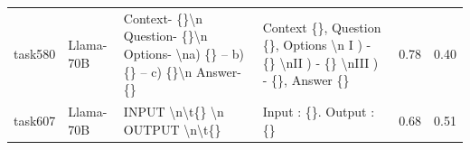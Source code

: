\begin{longtable}{@{}p{0.8cm\tiny}p{1cm\tiny}p{4.1cm\ttfamily\tiny}p{4.1cm\ttfamily\tiny}p{0.8cm\tiny}p{0.8cm\tiny}@{}}
task580   & Llama-70B  & Context- \{\}\textbackslash{}n Question- \{\}\textbackslash{}n Options- \textbackslash{}na) \{\} -- b) \{\} -- c) \{\}\textbackslash{}n Answer- \{\}                                                                                                                                                                                                                                                                                                                                                                    & Context \{\}, Question \{\}, Options \textbackslash{}n I ) - \{\} \textbackslash{}nII ) - \{\} \textbackslash{}nIII ) - \{\}, Answer \{\}                                                                                                                                                                                                                                                                                                                                                                                                                                         & 0.78 & 0.40 \\
task607   & Llama-70B  & INPUT \textbackslash{}n\textbackslash{}t\{\} \textbackslash{}n OUTPUT \textbackslash{}n\textbackslash{}t\{\}                                                                                                                                                                                                                                                                                                                                                                                                            & Input : \{\}. Output : \{\}                                                                                                                                                                                                                                                                                                                                                                                                                                                                                                                                                       & 0.68 & 0.51 \\

\end{longtable}
